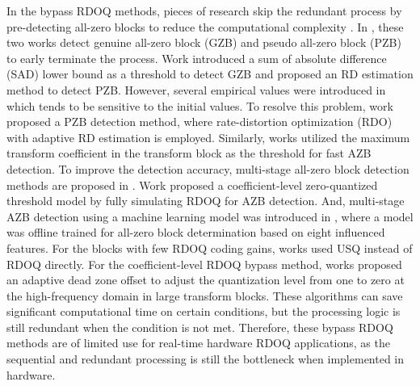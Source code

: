 \documentclass[lettersize,journal]{IEEEtran}
\begin{document}
In the bypass RDOQ methods, pieces of research skip the redundant process by pre-detecting all-zero blocks to reduce the computational complexity \cite{lee2016all-zero, wang2017fastrdoq}. In \cite{fan2016hybridzreoblock, cui2018hybrid}, these two works detect genuine all-zero block (GZB) and pseudo all-zero block (PZB) to early terminate the process. Work \cite{fan2016hybridzreoblock} introduced a sum of absolute difference (SAD) lower bound as a threshold to detect GZB and proposed an RD estimation method to detect PZB. However, several empirical values were introduced in \cite{fan2016hybridzreoblock} which tends to be sensitive to the initial values. To resolve this problem, work \cite{cui2018hybrid} proposed a PZB detection method, where rate-distortion optimization (RDO) with adaptive RD estimation is employed. Similarly, works \cite{cui2017adaptive, wei2019all} utilized the maximum transform coefficient in the transform block as the threshold for fast AZB detection. To improve the detection accuracy, multi-stage all-zero block detection methods are proposed in \cite{yin2018efficient, yin2020multistageallzerodetection}. Work \cite{yin2018efficient} proposed a coefficient-level zero-quantized threshold model by fully simulating RDOQ for AZB detection. And, multi-stage AZB detection using a machine learning model was introduced in \cite{yin2020multistageallzerodetection}, where a model was offline trained for all-zero block determination based on eight influenced features. For the blocks with few RDOQ coding gains, works \cite{lee2015fastquantizationmethod, zhang2015fastrdoq} used USQ instead of RDOQ directly. For the coefficient-level RDOQ bypass method, works \cite{xu2018simplifiedrdoq, xu2020simplifiedLevelEstimation} proposed an adaptive dead zone offset to adjust the quantization level from one to zero at the high-frequency domain in large transform blocks. These algorithms can save significant computational time on certain conditions, but the processing logic is still redundant when the condition is not met. Therefore, these bypass RDOQ methods are of limited use for real-time hardware RDOQ applications, as the sequential and redundant processing is still the bottleneck when implemented in hardware. 
\end{document}
